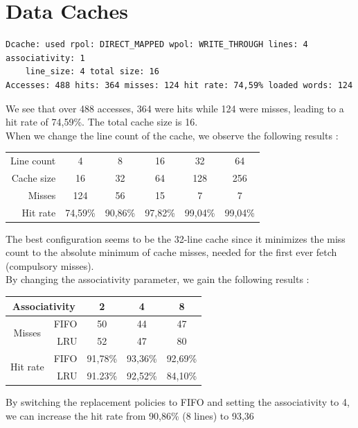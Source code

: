\documentclass[a4paper]{report}
\begin{document}

\section{Data Caches}

\begin{verbatim}
Dcache: used rpol: DIRECT_MAPPED wpol: WRITE_THROUGH lines: 4 associativity: 1
    line_size: 4 total size: 16
Accesses: 488 hits: 364 misses: 124 hit rate: 74,59% loaded words: 124
\end{verbatim}

We see that over 488 accesses, 364 were hits while 124 were misses, leading to a hit rate of 74,59\%. The
total cache size is 16.
\mbox{}\\

When we change the line count of the cache, we observe the following results :

\begin{center}
	\begin{tabular}{|r||c|c|c|c|c|}
		\hline
		Line count & 4 & 8 & 16 & 32 & 64 \\
		Cache size & 16 & 32 & 64 & 128 & 256 \\
		Misses     & 124 & 56 & 15 & 7 & 7 \\
		Hit rate   & 74,59\% & 90,86\% & 97,82\% & 99,04\% & 99,04\% \\
		\hline
	\end{tabular}
\end{center}

The best configuration seems to be the 32-line cache since it minimizes the miss count to the absolute minimum
of cache misses, needed for the first ever fetch (compulsory misses).
\mbox{}\\

By changing the associativity parameter, we gain the following results :

\begin{center}
	\begin{tabular}{|c|r||c|c|c|}
		\hline
		\multicolumn{2}{|c||}{Associativity} & 2 & 4 & 8 \\
		\hline
		\multirow{2}{*}{Misses}   & FIFO  & 50 & 44 & 47 \\
		                          & LRU   & 52 & 47 & 80 \\
		\multirow{2}{*}{Hit rate} & FIFO  & 91,78\% & 93,36\% & 92,69\% \\
		                          & LRU   & 91.23\% & 92,52\% & 84,10\% \\
		\hline
	\end{tabular}
\end{center}

By switching the replacement policies to FIFO and setting the associativity to 4, we can increase the hit
rate from 90,86\% (8 lines) to 93,36%
\end{document}
